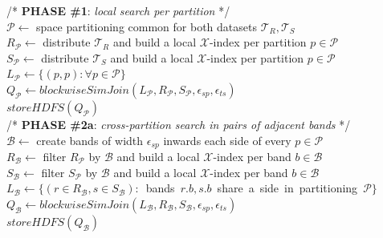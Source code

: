 \begin{algorithm}[!ht]
\begin{small}
  \DontPrintSemicolon

  \nonl /*  {\bf PHASE \#1}: {\em local search per partition} */ \\
  
  $\mathcal{P} \leftarrow$ space partitioning common for both datasets $\mathcal{T}_{R}, \mathcal{T}_{S}$ \\
  $R_{\mathcal{P}} \leftarrow $ distribute $\mathcal{T}_{R}$ and build a local $\mathcal{X}$-index per partition $p \in \mathcal{P}$\\
  $S_{\mathcal{P}} \leftarrow $ distribute $\mathcal{T}_{S}$ and build a local $\mathcal{X}$-index per partition $p \in \mathcal{P}$\\
  \mbox{$L_{\mathcal{P}} \leftarrow \{ ( p , p ): \forall p \in \mathcal{P} \}$}  \\
  $Q_{\mathcal{P}} \leftarrow blockwiseSimJoin(L_{\mathcal{P}}, R_{\mathcal{P}}, S_{\mathcal{P}},\epsilon_{sp}, \epsilon_{ts})$ \\  
  $storeHDFS(Q_{\mathcal{P}})$   \\

  \nonl /*  {\bf PHASE \#2a}: {\em cross-partition search in pairs of adjacent bands} */ \\
  
  $\mathcal{B} \leftarrow$ create bands of width $\epsilon_{sp}$ inwards each side of every $p \in \mathcal{P}$ \\
  $R_{\mathcal{B}} \leftarrow $ filter $R_{\mathcal{P}}$ by $\mathcal{B}$ and build a local $\mathcal{X}$-index per band $b \in \mathcal{B}$\\
  $S_{\mathcal{B}} \leftarrow $ filter $S_{\mathcal{P}}$ by $\mathcal{B}$ and build a local $\mathcal{X}$-index per band $b \in \mathcal{B}$\\
  \mbox{$L_{\mathcal{B}} \leftarrow \{ ( r \in R_{\mathcal{B}}, s \in S_{\mathcal{B}}):$ bands $r.b, s.b$ share a side in partitioning $\mathcal{P}\}$} \\
  
  $Q_{\mathcal{B}} \leftarrow blockwiseSimJoin(L_{\mathcal{B}}, R_{\mathcal{B}}, S_{\mathcal{B}},\epsilon_{sp}, \epsilon_{ts})$ \\  
  $storeHDFS(Q_{\mathcal{B}})$  \\
  

\end{small}
\end{algorithm}
